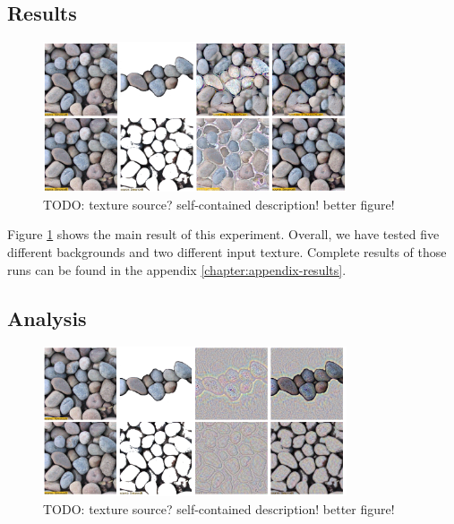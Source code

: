 \subsection{Results}
\label{section:results-experiments-01-results}

\begin{figure}[ht]
    \begin{center}
        \includegraphics[width=0.8\textwidth]{images/ex01-pebbles-1000steps-crop.png}
        \caption{{\color{red} TODO: texture source? self-contained description! better figure!}}
        \label{fig:ex01-pebbles-1000steps}
    \end{center}
\end{figure}

Figure \ref{fig:ex01-pebbles-1000steps} shows the main result of this experiment. Overall, we have tested five different backgrounds and two different input texture. Complete results of those runs can be found in the appendix \ref{chapter:appendix-results}.

\subsection{Analysis}
\label{section:results-experiments-01-analysis}

\begin{figure}[ht]
    \begin{center}
        \includegraphics[width=0.8\textwidth]{images/ex01-pebbles-5steps-crop.png}
        \caption{{\color{red} TODO: texture source? self-contained description! better figure!}}
        \label{fig:ex01-pebbles-5steps}
    \end{center}
\end{figure}

